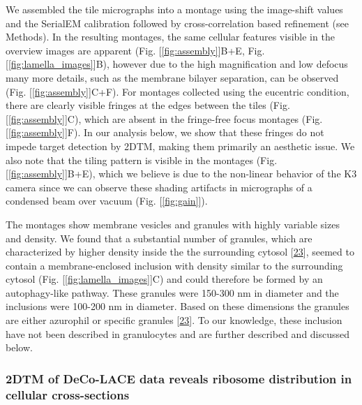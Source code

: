 \documentclass[
]{article}
\begin{document}
We assembled the tile micrographs into a montage using the image-shift values
and the SerialEM calibration followed by cross-correlation based refinement (see
Methods). In the resulting montages, the same cellular features visible in the
overview images are apparent (Fig. {[}\ref{fig:assembly}{]}B+E, Fig. {[}\ref{fig:lamella_images}{]}B), however
due to the high magnification and low defocus many more details, such as the
membrane bilayer separation, can be observed (Fig. {[}\ref{fig:assembly}{]}C+F). For montages collected using the
eucentric condition, there are clearly visible fringes at the edges between the
tiles (Fig. {[}\ref{fig:assembly}{]}C), which are absent in the fringe-free focus montages (Fig. {[}\ref{fig:assembly}{]}F). In our analysis
below, we show that these fringes do not impede target detection by 2DTM, making
them primarily an aesthetic issue. We also note that the tiling
pattern is visible in the montages (Fig. {[}\ref{fig:assembly}{]}B+E), which we believe is due to the non-linear
behavior of the K3 camera since we can observe these shading artifacts in micrographs of a condensed beam over vacuum (Fig. {[}\ref{fig:gain}{]}).

The montages show membrane vesicles and granules with highly variable sizes and
density. We found that a substantial number of granules, which are characterized by higher
density inside the the surrounding cytosol {[}\protect\hyperlink{ref-xE2EhAcH}{23}{]}, seemed to contain a membrane-enclosed inclusion with density similar to
the surrounding cytosol (Fig. {[}\ref{fig:lamella_images}{]}C) and could therefore be formed
by an autophagy-like pathway. These granules were
150-300 nm in diameter and the inclusions were 100-200 nm in diameter. Based on
these dimensions the granules are either azurophil or specific granules {[}\protect\hyperlink{ref-xE2EhAcH}{23}{]}. To our
knowledge, these inclusion have not been described in granulocytes and are
further described and discussed below.

\hypertarget{dtm-of-deco-lace-data-reveals-ribosome-distribution-in-cellular-cross-sections}{%
\subsubsection{2DTM of DeCo-LACE data reveals ribosome distribution in cellular cross-sections}\label{dtm-of-deco-lace-data-reveals-ribosome-distribution-in-cellular-cross-sections}}
\end{document}
